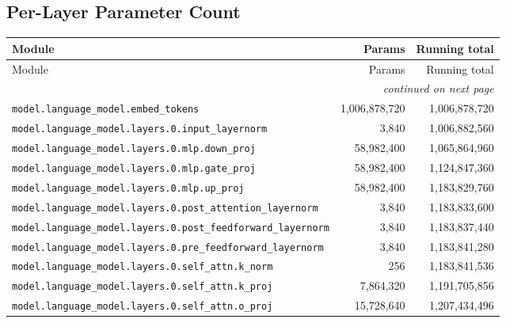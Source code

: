 \documentclass[10pt,a4paper]{article}
\theoremstyle{definition}
\begin{document}
\begin{appendices}
\section{Per-Layer Parameter Count}
\begin{longtable}{p{9.5cm}rr}
\toprule
Module & Params & Running total \\
\midrule
\endfirsthead
\toprule
Module & Params & Running total \\
\midrule
\endhead
\midrule \multicolumn{3}{r}{\textit{continued on next page}} \\
\endfoot
\bottomrule
\endlastfoot
\texttt{model.\allowbreak{}language\_model.\allowbreak{}embed\_tokens} & 1,006,878,720 & 1,006,878,720 \\
\texttt{model.\allowbreak{}language\_model.\allowbreak{}layers.\allowbreak{}0.\allowbreak{}input\_layernorm} & 3,840 & 1,006,882,560 \\
\texttt{model.\allowbreak{}language\_model.\allowbreak{}layers.\allowbreak{}0.\allowbreak{}mlp.\allowbreak{}down\_proj} & 58,982,400 & 1,065,864,960 \\
\texttt{model.\allowbreak{}language\_model.\allowbreak{}layers.\allowbreak{}0.\allowbreak{}mlp.\allowbreak{}gate\_proj} & 58,982,400 & 1,124,847,360 \\
\texttt{model.\allowbreak{}language\_model.\allowbreak{}layers.\allowbreak{}0.\allowbreak{}mlp.\allowbreak{}up\_proj} & 58,982,400 & 1,183,829,760 \\
\texttt{model.\allowbreak{}language\_model.\allowbreak{}layers.\allowbreak{}0.\allowbreak{}post\_attention\_layernorm} & 3,840 & 1,183,833,600 \\
\texttt{model.\allowbreak{}language\_model.\allowbreak{}layers.\allowbreak{}0.\allowbreak{}post\_feedforward\_layernorm} & 3,840 & 1,183,837,440 \\
\texttt{model.\allowbreak{}language\_model.\allowbreak{}layers.\allowbreak{}0.\allowbreak{}pre\_feedforward\_layernorm} & 3,840 & 1,183,841,280 \\
\texttt{model.\allowbreak{}language\_model.\allowbreak{}layers.\allowbreak{}0.\allowbreak{}self\_attn.\allowbreak{}k\_norm} & 256 & 1,183,841,536 \\
\texttt{model.\allowbreak{}language\_model.\allowbreak{}layers.\allowbreak{}0.\allowbreak{}self\_attn.\allowbreak{}k\_proj} & 7,864,320 & 1,191,705,856 \\
\texttt{model.\allowbreak{}language\_model.\allowbreak{}layers.\allowbreak{}0.\allowbreak{}self\_attn.\allowbreak{}o\_proj} & 15,728,640 & 1,207,434,496 \\

\end{longtable}
\end{appendices}
\end{document}
